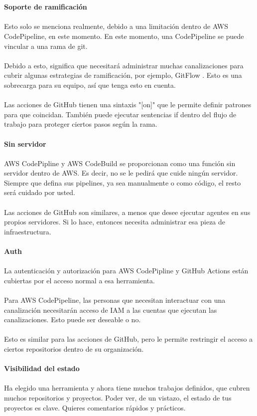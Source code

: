\documentclass[twoside,twocolumn]{article}
\begin{document}
\\\\
\textbf{Soporte de ramificación}
\\\\Esto solo se menciona realmente, debido a una limitación dentro de AWS CodePipeline, en este momento. En este momento, una CodePipeline se puede vincular a una rama de git.\\\\
Debido a esto, significa que necesitará administrar muchas canalizaciones para cubrir algunas estrategias de ramificación, por ejemplo, GitFlow . Esto es una sobrecarga para su equipo, así que tenga esto en cuenta.\\\\
Las acciones de GitHub tienen una sintaxis "[on]" que le permite definir patrones para que coincidan. También puede ejecutar sentencias if dentro del flujo de trabajo para proteger ciertos pasos según la rama.
\\\\
\textbf{Sin servidor}
\\\\AWS CodePipline y AWS CodeBuild se proporcionan como una función sin servidor dentro de AWS. Es decir, no se le pedirá que cuide ningún servidor. Siempre que defina sus pipelines, ya sea manualmente o como código, el resto será cuidado por usted.\\\\
Las acciones de GitHub son similares, a menos que desee ejecutar agentes en sus propios servidores. Si lo hace, entonces necesita administrar esa pieza de infraestructura.
\\\\
\textbf{Auth}
\\\\La autenticación y autorización para AWS CodePipline y GitHub Actions están cubiertas por el acceso normal a esa herramienta.\\\\
Para AWS CodePipeline, las personas que necesitan interactuar con una canalización necesitarán acceso de IAM a las cuentas que ejecutan las canalizaciones. Esto puede ser deseable o no.\\\\
Esto es similar para las acciones de GitHub, pero le permite restringir el acceso a ciertos repositorios dentro de su organización.
\\\\
\textbf{Visibilidad del estado}
\\\\Ha elegido una herramienta y ahora tiene muchos trabajos definidos, que cubren muchos repositorios y proyectos. Poder ver, de un vistazo, el estado de tus proyectos es clave. Quieres comentarios rápidos y prácticos.\\\\
\end{document}
